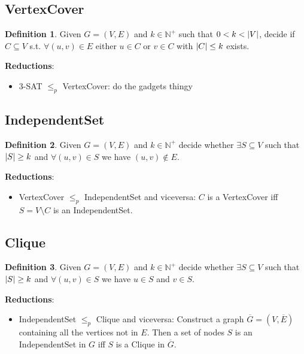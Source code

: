 \documentclass[8pt]{extarticle}
\newcommand{\N}{\mathbb{N}}
\theoremstyle{definition}
\newtheorem{definition}{Definition}[section]
\theoremstyle{remark}
\numberwithin{equation}{section}
\newcommand{\reducesto}{\leq_p}
\begin{document}
\begin{landscape}
\begin{multicols}{3}
        \subsection{VertexCover}
        \begin{definition}
            Given $G=(V, E)$ and $k \in \N^+$ such that $0 < k < \abs{V}$, decide if $C \subseteq V$ s.t. $\forall (u, v) \in E$ either $u \in C$ or $v \in C$ with $\abs{C} \leq k$ exists.
        \end{definition}

        \textbf{Reductions}:
        \begin{itemize}
            \item 3-SAT $\reducesto$ VertexCover: do the gadgets thingy
        \end{itemize}

        \subsection{IndependentSet}
        \begin{definition}
            Given $G=(V,E)$ and $k \in \N^+$ decide whether $\exists S \subseteq V$ such that $\abs{S} \geq k$ and $\forall (u, v) \in S$ we have $(u, v) \notin E$.
        \end{definition}

        \textbf{Reductions}:
        \begin{itemize}
            \item VertexCover $\reducesto$ IndependentSet and viceversa: $C$ is a VertexCover iff $S = V \setminus C$ is an IndependentSet.
        \end{itemize}

        \subsection{Clique}
        \begin{definition}
            Given $G=(V,E)$ and $k \in \N^+$ decide whether $\exists S \subseteq V$ such that $\abs{S} \geq k$ and $\forall (u, v) \in S$ we have $u \in S$ and $v \in S$.
        \end{definition}

        \textbf{Reductions}:
        \begin{itemize}
            \item IndependentSet $\reducesto$ Clique and viceversa: Construct a graph $\overline{G} = (V, \overline{E})$ containing all the vertices not in $E$. Then a set of nodes $S$ is an IndependentSet in $G$ iff $S$ is a Clique in $\overline{G}$.
        \end{itemize}



\end{multicols}
\end{landscape}
\end{document}
